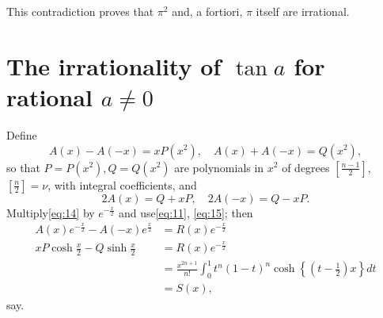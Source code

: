 This contradiction proves that $\pi^2$ and, a fortiori, $\pi$ itself are irrational.

\section{The irrationality of $\tan a$ for rational $a \ne 0$}

Define
\[ A(x) - A(-x) = x P(x^2), \quad A(x) + A(-x) = Q(x^2), \]
so that $P=P(x^2), Q=Q(x^2)$ are polynomials in $x^2$ of degrees $[\frac{n-1}{2}]$, $[\frac{n}{2}] = \nu$, with integral coefficients, and
\[ 2A(x) = Q+xP, \quad 2A(-x) = Q-xP. \]
Multiply\eqref{eq:14} by $e^{-\frac{x}{2}}$ and use\eqref{eq:11}, \eqref{eq:15}; then
\begin{equation} \begin{aligned} A(x) e^{-\frac{x}{2}} - A(-x)e^{\frac{x}{2}} &= R(x) e^{-\frac{x}{2}} \\ xP \cosh \frac{x}{2} - Q \sinh \frac{x}{2} &= R(x)e^{-\frac{x}{2}} \\ &= \frac{x^{2n+1}}{n!} \int_{0}^{1} t^{n} (1-t)^{n} \cosh\left\{\left(t-\frac{1}{2}\right)x\right\} dt \\ &= S(x), \end{aligned} \tag{19}\label{eq:19} \end{equation}
say.

